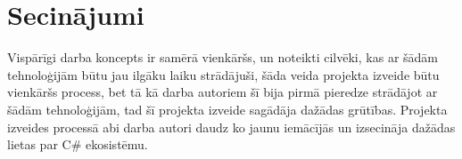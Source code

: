 \section{Secinājumi}

    Vispārīgi darba koncepts ir samērā vienkāršs, un noteikti cilvēki, kas ar šādām tehnoloģijām būtu jau
    ilgāku laiku strādājuši, šāda veida projekta izveide būtu vienkāršs process, bet tā kā darba autoriem
    šī bija pirmā pieredze strādājot ar šādām tehnoloģijām, tad šī projekta izveide sagādāja dažādas
    grūtības. Projekta izveides processā abi darba autori daudz ko jaunu iemācījās un izsecināja
    dažādas lietas par C\# ekosistēmu.

